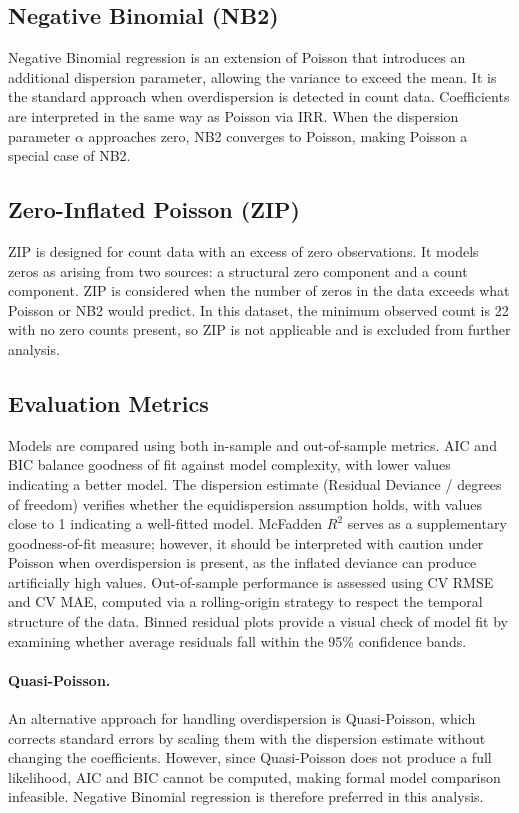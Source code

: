 \documentclass[12pt, a4paper]{article}
\begin{document}
\subsection{Negative Binomial (NB2)}

Negative Binomial regression is an extension of Poisson that introduces an
additional dispersion parameter, allowing the variance to exceed the mean.
It is the standard approach when overdispersion is detected in count data.
Coefficients are interpreted in the same way as Poisson via IRR. When the dispersion parameter $\alpha$ approaches zero, NB2 converges
to Poisson, making Poisson a special case of NB2.

\subsection{Zero-Inflated Poisson (ZIP)}

ZIP is designed for count data with an excess of zero observations. It
models zeros as arising from two sources: a structural zero component and
a count component. ZIP is considered when the number of zeros in the data
exceeds what Poisson or NB2 would predict. In this dataset, the minimum
observed count is 22 with no zero counts present, so ZIP is not applicable
and is excluded from further analysis.

\subsection{Evaluation Metrics}

Models are compared using both in-sample and out-of-sample metrics.
AIC and BIC balance goodness of fit against model complexity, with lower
values indicating a better model. The dispersion estimate (Residual
Deviance / degrees of freedom) verifies whether the equidispersion
assumption holds, with values close to 1 indicating a well-fitted model.
McFadden $R^2$ serves as a supplementary goodness-of-fit measure; however,
it should be interpreted with caution under Poisson when overdispersion is
present, as the inflated deviance can produce artificially high values.
Out-of-sample performance is assessed using CV RMSE and CV MAE, computed
via a rolling-origin strategy to respect the temporal structure of the data.
Binned residual plots provide a visual check of model fit by examining
whether average residuals fall within the 95\% confidence bands.


\paragraph{Quasi-Poisson.}
An alternative approach for handling overdispersion is Quasi-Poisson, which
corrects standard errors by scaling them with the dispersion estimate without
changing the coefficients. However, since Quasi-Poisson does not produce a
full likelihood, AIC and BIC cannot be computed, making formal model
comparison infeasible. Negative Binomial regression is therefore preferred
in this analysis.
\end{document}
